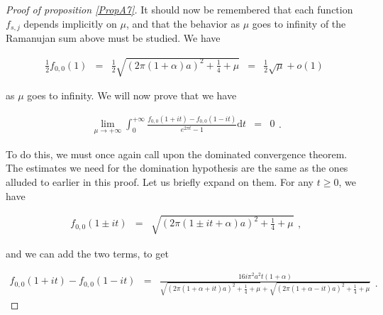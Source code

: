 \documentclass{jams-l}
\theoremstyle{definition}
\theoremstyle{remark}
\numberwithin{equation}{section}
\begin{document}
\begin{proof}[Proof of proposition \ref{PropA7}]
                \noindent It should now be remembered that each function $f_{s,j}$ depends implicitly on $\mu$, and that the behavior as $\mu$ goes to infinity of the Ramanujan sum above must be studied. We have
                
                \[ \begin{array}{lllll}
                        \frac{1}{2} f_{0,0} \left( 1 \right) & = & \frac{1}{2} \sqrt{\left( 2 \pi \left( 1 + \alpha \right) a \right)^2 + \frac{1}{4} + \mu} & = & \frac{1}{2} \sqrt{\mu} + o \left( 1 \right)
                    \end{array} \]
                
                \noindent as $\mu$ goes to infinity. We will now prove that we have
                
                \begin{equation}
                \label{EqA7RamanujanSumAsymptotic}
                    \begin{array}{lll}
                        \lim\limits_{\mu \rightarrow + \infty} \int_0^{+ \infty} \frac{f_{0,0} \left( 1 + it \right) - f_{0,0} \left( 1 - it \right)}{e^{2 \pi t} - 1} \mathrm{d}t & = & 0
                    \end{array} .
                \end{equation}
                
                \noindent To do this, we must once again call upon the dominated convergence theorem. The estimates we need for the domination hypothesis are the same as the ones alluded to earlier in this proof. Let us briefly expand on them. For any $t \geqslant 0$, we have
                
                \[ \begin{array}{lll}
                        f_{0,0} \left( 1 \pm i t \right) & = & \sqrt{\left( 2 \pi \left( 1 \pm i t + \alpha \right) a \right)^2 + \frac{1}{4} + \mu}
                    \end{array} , \]
                
                \noindent and we can add the two terms, to get
                
                \[ \begin{array}{lll}
                        f_{0,0} \left( 1 + i t \right) - f_{0,0} \left( 1 - i t \right) & = & \frac{16 i \pi^2 a^2 t \left( 1 + \alpha \right)}{\sqrt{\left( 2 \pi \left( 1 + \alpha + it \right) a \right)^2 + \frac{1}{4} + \mu} + \sqrt{\left( 2 \pi \left( 1 + \alpha - it \right) a \right)^2 + \frac{1}{4} + \mu}}
                    \end{array} . \]
                

\end{proof}
\end{document}
